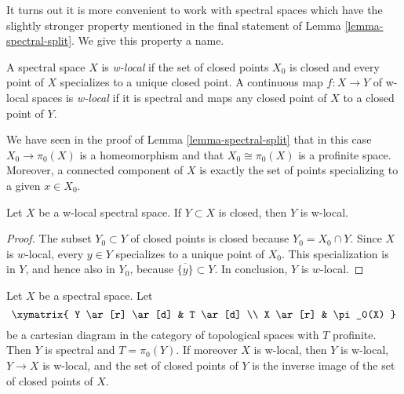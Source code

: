 \noindent
It turns out it is more convenient to work with spectral
spaces which have the slightly stronger property mentioned in
the final statement of Lemma \ref{lemma-spectral-split}.
We give this property a name.

\begin{definition}
\label{definition-w-local}
A spectral space $X$ is {\it w-local} if the set of closed points $X_0$
is closed and every point of $X$ specializes to a unique closed point.
A continuous map $f : X \to Y$ of w-local spaces is {\it w-local}
if it is spectral and maps any closed point of $X$ to a closed point of $Y$.
\end{definition}

\noindent
We have seen in the proof of Lemma \ref{lemma-spectral-split}
that in this case $X_0 \to \pi_0(X)$ is a homeomorphism and that
$X_0 \cong \pi_0(X)$ is a profinite space. Moreover, a connected
component of $X$ is exactly the set of points specializing to
a given $x \in X_0$.

\begin{lemma}
\label{lemma-closed-subspace-w-local}
Let $X$ be a w-local spectral space. If $Y \subset X$ is closed,
then $Y$ is w-local.
\end{lemma}

\begin{proof}
The subset $Y_0 \subset Y$ of closed points is closed because
$Y_0 = X_0 \cap Y$. Since $X$ is $w$-local, every $y \in Y$ specializes
to a unique point of $X_0$. This specialization is in $Y$, and hence
also in $Y_0$, because $\overline{\{y\}}\subset Y$. In conclusion, $Y$
is $w$-local.
\end{proof}

\begin{lemma}
\label{lemma-silly}
Let $X$ be a spectral space. Let
$$
\xymatrix{
Y \ar[r] \ar[d] & T \ar[d] \\
X \ar[r] & \pi_0(X)
}
$$
be a cartesian diagram in the category of topological spaces
with $T$ profinite. Then $Y$ is spectral and $T = \pi_0(Y)$.
If moreover $X$ is w-local, then $Y$ is w-local, $Y \to X$ is w-local,
and the set of closed points of $Y$ is the inverse image of the
set of closed points of $X$.
\end{lemma}

